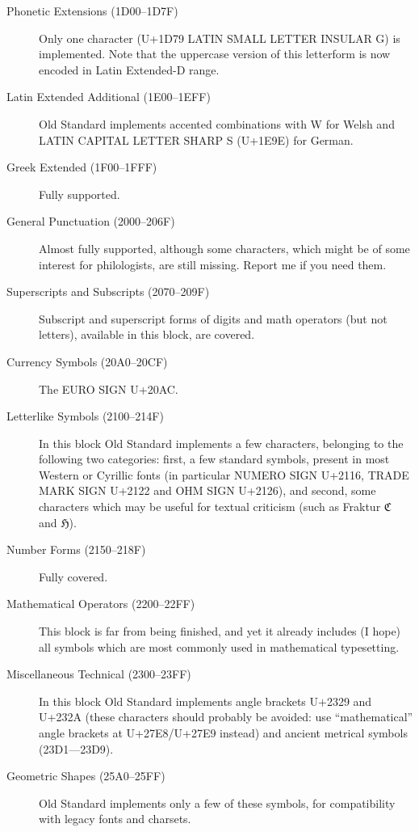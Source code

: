 \documentclass[12pt,a4paper,openany]{book}
\begin{document}
\begin{description}
\item[Phonetic Extensions (1D00–1D7F)] Only one character (U+1D79 LATIN
SMALL LETTER INSULAR G) is implemented. Note that the uppercase version 
of this letterform is now encoded in Latin Extended-D range.

\item[Latin Extended Additional (1E00–1EFF)] Old Standard implements 
accented combinations with W for Welsh and LATIN CAPITAL LETTER SHARP S
(U+1E9E) for German.

\item[Greek Extended (1F00–1FFF)] Fully supported.

\item[General Punctuation (2000–206F)] Almost fully supported, although
some characters, which might be of some interest for philologists, are
still missing. Report me if you need them.

\item[Superscripts and Subscripts (2070–209F)] Subscript and superscript
forms of digits and math operators (but not letters), available in this
block, are covered.

\item[Currency Symbols (20A0–20CF)] The EURO SIGN U+20AC.

\item[Letterlike Symbols (2100–214F)] In this block Old Standard implements
a few characters, belonging to the following two categories: first, a few
standard symbols, present in most Western or Cyrillic fonts (in particular
NUMERO SIGN U+2116, TRADE MARK SIGN U+2122 and OHM SIGN U+2126), and second,
some characters which may be useful for textual criticism (such as Fraktur ℭ
and ℌ).

\item[Number Forms (2150–218F)] Fully covered.

\item[Mathematical Operators (2200–22FF)] This block is far from being
finished, and yet it already includes (I hope) all symbols which are most
commonly used in mathematical typesetting.

\item[Miscellaneous Technical (2300–23FF)] In this block Old Standard
implements angle brackets U+2329 and U+232A (these characters should
probably be avoided: use “mathematical” angle brackets at U+27E8/U+27E9
instead) and ancient metrical symbols (23D1—23D9).

\item[Geometric Shapes (25A0–25FF)] Old Standard implements only a few of
these symbols, for compatibility with legacy fonts and charsets.


\end{description}
\end{document}
